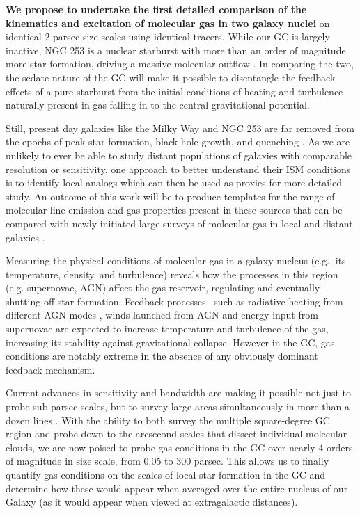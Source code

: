 \documentclass{article}
\begin{document}
{\bf We propose to undertake the first detailed comparison of the kinematics and excitation of molecular gas in two galaxy nuclei} on identical 2 parsec size scales using identical tracers. While our GC is largely inactive, NGC 253 is a nuclear starburst with more than an order of magnitude more star formation, driving a massive molecular outflow \citep{Bolatto13}. In comparing the two, the sedate nature of the GC will make it possible to disentangle the feedback effects of a pure starburst \citep[like the GC, the black hole at the center of NGC 253 is believed to be quiescent;][]{MS10,Lehmer13} from the initial conditions of heating and turbulence naturally present in gas falling in to the central gravitational potential. 

Still, present day galaxies like the Milky Way and NGC 253 are far removed from the epochs of peak star formation, black hole growth, and quenching \citep[z$>$ 1;][]{Madau98, Hasinger05, Whitaker12}.  As we are unlikely to ever be able to study distant populations of galaxies with comparable resolution or sensitivity, one approach to better understand their ISM conditions is to identify local analogs which can then be used as proxies for more detailed study. An outcome of this work will be to produce templates for the range of molecular line emission and gas properties present in these sources that can be compared with newly initiated large surveys of molecular gas in local and distant galaxies \citep[e.g., PHANGS and ASPECS;][]{Walter16,Leroy16}. 

Measuring the physical conditions of molecular gas in a galaxy nucleus (e.g., its temperature, density, and turbulence) reveals how the processes in this region (e.g. supernovae, AGN) affect the gas reservoir, regulating and eventually shutting off star formation. Feedback processes-- such as radiative heating from different AGN modes \citep[e.g.,][]{Xie17}, winds launched from AGN \citep[e.g.,][]{Yuan16} and energy input from supernovae \citep{Efst00} are expected to increase temperature and turbulence of the gas, increasing its stability against gravitational collapse. However in the GC, gas conditions are notably extreme \citep[T$>$50-400 K, $\sigma>$ 10 km/s on 10 pc size scales;][]{Shetty12,Mills13a,Ginsburg16} in the absence of any obviously dominant feedback mechanism. 

Current advances in sensitivity and bandwidth are making it possible not just to probe sub-parsec scales, but to survey large areas simultaneously in more than a dozen lines \citep[e.g.,][]{Jones12, Jones13, Ginsburg16, Krieger17}. With the ability to both survey the multiple square-degree GC region and probe down to the arcsecond scales that dissect individual molecular clouds, we are now poised to probe gas conditions in the GC over nearly 4 orders of magnitude in size scale, from 0.05 to 300 parsec. This allows us to finally  quantify gas conditions on the scales of local star formation in the GC and determine how these would appear when averaged over the entire nucleus of our Galaxy (as it would appear when viewed at extragalactic distances).
\end{document}
